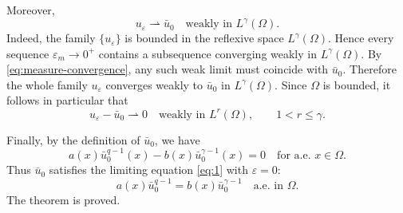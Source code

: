 \documentclass[preprint,11pt]{elsarticle}
\numberwithin{equation}{section}
\begin{document}
Moreover,
\[
u_\varepsilon\rightharpoonup\bar u_0
\quad\text{weakly in }L^\gamma(\Omega).
\]
Indeed, the family \(\{u_\varepsilon\}\) is bounded in the reflexive space
\(L^\gamma(\Omega)\). Hence every sequence \(\varepsilon_m\to0^+\) contains
a subsequence converging weakly in \(L^\gamma(\Omega)\). By
\eqref{eq:measure-convergence}, any such weak limit must coincide with
\(\bar u_0\). Therefore the whole family \(u_\varepsilon\) converges weakly
to \(\bar u_0\) in \(L^\gamma(\Omega)\). Since \(\Omega\) is bounded, it
follows in particular that
\[
u_\varepsilon-\bar u_0\rightharpoonup0
\quad\text{weakly in }L^r(\Omega),
\qquad
1<r\le\gamma .
\]

Finally, by the definition of \(\bar u_0\), we have
\[
a(x)\bar u_0^{q-1}(x)
-
b(x)\bar u_0^{\gamma-1}(x)
=
0
\quad\text{for a.e. }x\in\Omega .
\]
Thus \(\bar u_0\) satisfies the limiting equation \eqref{eq:1} with
\(\varepsilon=0\):
\[
a(x)\bar u_0^{q-1}
=
b(x)\bar u_0^{\gamma-1}
\quad\text{a.e. in }\Omega .
\]
The theorem is proved.
\end{document}
